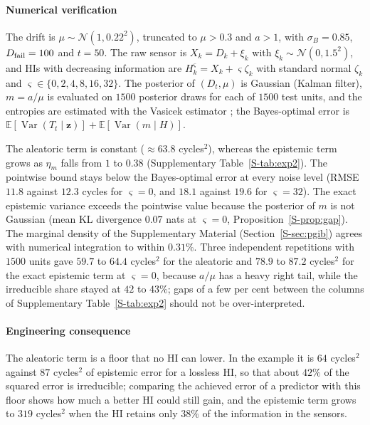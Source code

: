 \documentclass[preprint,12pt]{elsarticle}
\theoremstyle{definition}
\newcommand{\E}{\mathbb{E}}
\DeclareMathOperator{\Var}{Var}
\begin{document}
\paragraph{Numerical verification}
\label{sec:physnum}
The drift is $\mu\sim\mathcal N(1,0.22^2)$, truncated to $\mu>0.3$ and $a>1$, with $\sigma_B=0.85$, $D_{\rm fail}=100$ and $t=50$. The raw sensor is $X_k=D_k+\xi_k$ with $\xi_k\sim\mathcal N(0,1.5^2)$, and HIs with decreasing information are $H^{\varsigma}_k=X_k+\varsigma\zeta_k$ with standard normal $\zeta_k$ and $\varsigma\in\{0,2,4,8,16,32\}$. The posterior of $(D_t,\mu)$ is Gaussian (Kalman filter), $m=a/\mu$ is evaluated on $1500$ posterior draws for each of $1500$ test units, and the entropies are estimated with the Vasicek estimator \cite{vasicek1976}; the Bayes-optimal error is $\E[\Var(T_t\mid\mathbf z)]+\E[\Var(m\mid H)]$.

The aleatoric term is constant ($\approx63.8$ cycles$^2$), whereas the epistemic term grows as $\eta_m$ falls from $1$ to $0.38$ (Supplementary Table~\ref{S-tab:exp2}). The pointwise bound stays below the Bayes-optimal error at every noise level (RMSE $11.8$ against $12.3$ cycles for $\varsigma=0$, and $18.1$ against $19.6$ for $\varsigma=32$). The exact epistemic variance exceeds the pointwise value because the posterior of $m$ is not Gaussian (mean KL divergence $0.07$ nats at $\varsigma=0$, Proposition~\ref{S-prop:gap}). The marginal density of the Supplementary Material (Section~\ref{S-sec:pgib}) agrees with numerical integration to within $0.31\%$. Three independent repetitions with $1500$ units gave $59.7$ to $64.4$ cycles$^2$ for the aleatoric and $78.9$ to $87.2$ cycles$^2$ for the exact epistemic term at $\varsigma=0$, because $a/\mu$ has a heavy right tail, while the irreducible share stayed at $42$ to $43\%$; gaps of a few per cent between the columns of Supplementary Table~\ref{S-tab:exp2} should not be over-interpreted.

\paragraph{Engineering consequence} The aleatoric term is a floor that no HI can lower. In the example it is $64$ cycles$^2$ against $87$ cycles$^2$ of epistemic error for a lossless HI, so that about $42\%$ of the squared error is irreducible; comparing the achieved error of a predictor with this floor shows how much a better HI could still gain, and the epistemic term grows to $319$ cycles$^2$ when the HI retains only $38\%$ of the information in the sensors.
\end{document}
